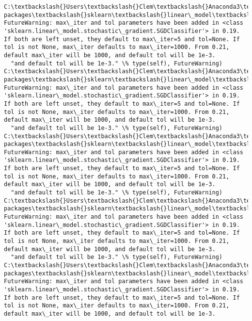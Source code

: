 \documentclass[11pt]{article}
\begin{document}
    \begin{Verbatim}[commandchars=\\\{\}]
C:\textbackslash{}Users\textbackslash{}Clem\textbackslash{}Anaconda3\textbackslash{}lib\textbackslash{}site-packages\textbackslash{}sklearn\textbackslash{}linear\_model\textbackslash{}stochastic\_gradient.py:128: FutureWarning: max\_iter and tol parameters have been added in <class 'sklearn.linear\_model.stochastic\_gradient.SGDClassifier'> in 0.19. If both are left unset, they default to max\_iter=5 and tol=None. If tol is not None, max\_iter defaults to max\_iter=1000. From 0.21, default max\_iter will be 1000, and default tol will be 1e-3.
  "and default tol will be 1e-3." \% type(self), FutureWarning)
C:\textbackslash{}Users\textbackslash{}Clem\textbackslash{}Anaconda3\textbackslash{}lib\textbackslash{}site-packages\textbackslash{}sklearn\textbackslash{}linear\_model\textbackslash{}stochastic\_gradient.py:128: FutureWarning: max\_iter and tol parameters have been added in <class 'sklearn.linear\_model.stochastic\_gradient.SGDClassifier'> in 0.19. If both are left unset, they default to max\_iter=5 and tol=None. If tol is not None, max\_iter defaults to max\_iter=1000. From 0.21, default max\_iter will be 1000, and default tol will be 1e-3.
  "and default tol will be 1e-3." \% type(self), FutureWarning)
C:\textbackslash{}Users\textbackslash{}Clem\textbackslash{}Anaconda3\textbackslash{}lib\textbackslash{}site-packages\textbackslash{}sklearn\textbackslash{}linear\_model\textbackslash{}stochastic\_gradient.py:128: FutureWarning: max\_iter and tol parameters have been added in <class 'sklearn.linear\_model.stochastic\_gradient.SGDClassifier'> in 0.19. If both are left unset, they default to max\_iter=5 and tol=None. If tol is not None, max\_iter defaults to max\_iter=1000. From 0.21, default max\_iter will be 1000, and default tol will be 1e-3.
  "and default tol will be 1e-3." \% type(self), FutureWarning)
C:\textbackslash{}Users\textbackslash{}Clem\textbackslash{}Anaconda3\textbackslash{}lib\textbackslash{}site-packages\textbackslash{}sklearn\textbackslash{}linear\_model\textbackslash{}stochastic\_gradient.py:128: FutureWarning: max\_iter and tol parameters have been added in <class 'sklearn.linear\_model.stochastic\_gradient.SGDClassifier'> in 0.19. If both are left unset, they default to max\_iter=5 and tol=None. If tol is not None, max\_iter defaults to max\_iter=1000. From 0.21, default max\_iter will be 1000, and default tol will be 1e-3.
  "and default tol will be 1e-3." \% type(self), FutureWarning)
C:\textbackslash{}Users\textbackslash{}Clem\textbackslash{}Anaconda3\textbackslash{}lib\textbackslash{}site-packages\textbackslash{}sklearn\textbackslash{}linear\_model\textbackslash{}stochastic\_gradient.py:128: FutureWarning: max\_iter and tol parameters have been added in <class 'sklearn.linear\_model.stochastic\_gradient.SGDClassifier'> in 0.19. If both are left unset, they default to max\_iter=5 and tol=None. If tol is not None, max\_iter defaults to max\_iter=1000. From 0.21, default max\_iter will be 1000, and default tol will be 1e-3.

\end{Verbatim}
\end{document}

